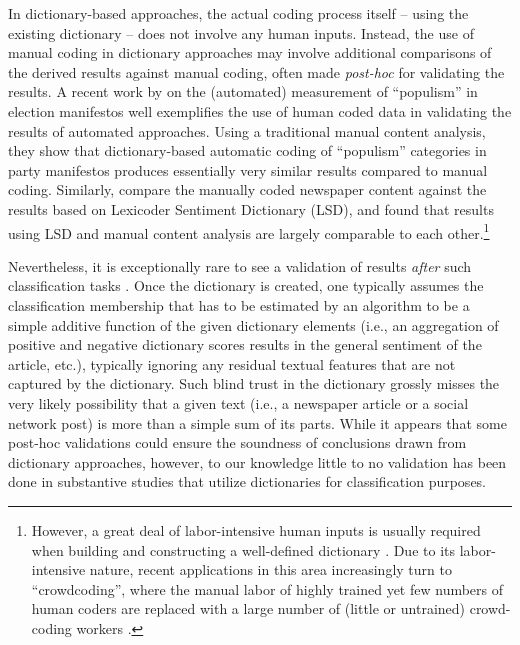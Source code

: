 \documentclass[man, floatsintext, 12pt, a4paper, noextraspace]{apa6}
\begin{document}
    In dictionary-based approaches, the actual coding process itself -- using the existing dictionary -- does not involve any human inputs. Instead, the use of manual coding in dictionary approaches may involve additional comparisons of the derived results against manual coding, often made \textit{post-hoc} for validating the results. A recent work by \textcite{Rooduijn2011} on the (automated) measurement of \enquote{populism} in election manifestos well exemplifies the use of human coded data in validating the results of automated approaches. Using a traditional manual content analysis, they show that dictionary-based automatic coding of \enquote{populism} categories in party manifestos produces essentially very similar results compared to manual coding. Similarly, \textcite{YoungSoroka2012} compare the manually coded newspaper content against the results based on Lexicoder Sentiment Dictionary (LSD), and found that results using LSD and manual content analysis are largely comparable to each other.\footnote{ However, a great deal of labor-intensive human inputs is usually required when building and constructing a well-defined dictionary \parencite{YoungSoroka2012, muddiman2018re}. Due to its labor-intensive nature, recent applications in this area increasingly turn to \enquote{crowdcoding}, where the manual labor of highly trained yet few numbers of human coders are replaced with a large number of (little or untrained) crowd-coding workers \parencites[][]{haselmayer2017sentiment, lind2017content}.} 
    
    Nevertheless, it is exceptionally rare to see a validation of results \textit{after} such classification tasks \parencites[yet for notable exceptions, see][]{muddiman2018re, YoungSoroka2012, gonzalez2015signals}. Once the dictionary is created, one typically assumes the classification membership that has to be estimated by an algorithm to be a simple additive function of the given dictionary elements (i.e., an aggregation of positive and negative dictionary scores results in the general sentiment of the article, etc.), typically ignoring any residual textual features that are not captured by the dictionary. Such blind trust in the dictionary grossly misses the very likely possibility that a given text (i.e., a newspaper article or a social network post) is more than a simple sum of its parts. While it appears that some post-hoc validations could ensure the soundness of conclusions drawn from dictionary approaches, however, to our knowledge little to no validation has been done in substantive studies that utilize dictionaries for classification purposes.
    
\end{document}
